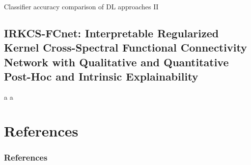 \documentclass[aspectratio=169]{beamer}
\let\oldcite\cite %
\renewcommand{\cite}[1]{{\tiny\oldcite{#1}}}
\begin{document}
\begin{frame}{Classifier accuracy comparison of DL approaches II}
    \centering
    \resizebox{0.7\linewidth}{!}{}
\end{frame}


\subsection{IRKCS-FCnet: Interpretable Regularized Kernel Cross-Spectral Functional Connectivity Network with Qualitative and Quantitative Post-Hoc and Intrinsic Explainability}

\begin{frame}{a}
    a
\end{frame}


\section{References}
\begin{frame}[allowframebreaks]%
\frametitle{References}
{\tiny 


}
\end{frame}
\end{document}
